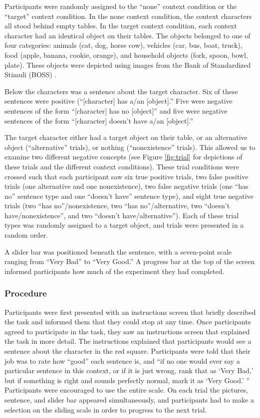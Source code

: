 \documentclass[10pt,letterpaper]{article}
\begin{document}
Participants were randomly assigned to the ``none'' context condition or the ``target'' context condition.  In the none context condition, the context characters all stood behind empty tables.  In the target context condition, each context character had an identical object on their tables.  The objects belonged to one of four categories: animals (cat, dog, horse cow), vehicles (car, bus, boat, truck), food (apple, banana, cookie, orange), and household objects (fork, spoon, bowl, plate).  These objects were depicted using images from the Bank of Standardized Stimuli (BOSS) \cite{brodeur2010}.  

Below the characters was a sentence about the target character.  Six of these sentences were positive (``[character] has a/an [object].''  Five were negative sentences of the form ``[character] has no [object]'' and five were negative sentences of the form ``[character] doesn't have a/an [object].'' 

The target character either had a target object on their table, or an alternative object (``alternative'' trials), or nothing (``nonexistence'' trials).  This allowed us to examine two different negative concepts (see Figure \ref{fig:trial}  for depictions of these trials and the different context conditions).    These trial conditions were crossed such that each participant saw six true positive trials, two false positive trials (one alternative and one nonexistence), two false negative trials (one ``has no'' sentence type and one ``doesn't have'' sentence type), and eight true negative trials (two ``has no''/nonexistence, two ``has no''/alternative, two ``doesn't have/nonexistence'', and two ``doesn't have/alternative'').  Each of these trial types was randomly assigned to a target object, and trials were presented in a random order.  

A slider bar was positioned beneath the sentence, with a seven-point scale ranging from ``Very Bad'' to ``Very Good.''  A progress bar at the top of the screen informed participants how much of the experiment they had completed. 

\subsubsection{Procedure}

Participants were first presented with an instructions screen that briefly described the task and informed them that they could stop at any time.  Once participants agreed to participate in the task, they saw an instructions screen that explained the task in more detail.  The instructions explained that participants would see a sentence about the character in the red square.  Participants were told that their job was to rate how ``good'' each sentence is, and ``if no one would ever say a particular sentence in this context, or if it is just wrong, rank that as `Very Bad,' but if something is right and sounds perfectly normal, mark it as `Very Good.' ''  Participants were encouraged to use the entire scale. On each trial the pictures, sentence, and slider bar appeared simultaneously, and participants had to make a selection on the sliding scale in order to progress to the next trial.  
\end{document}
